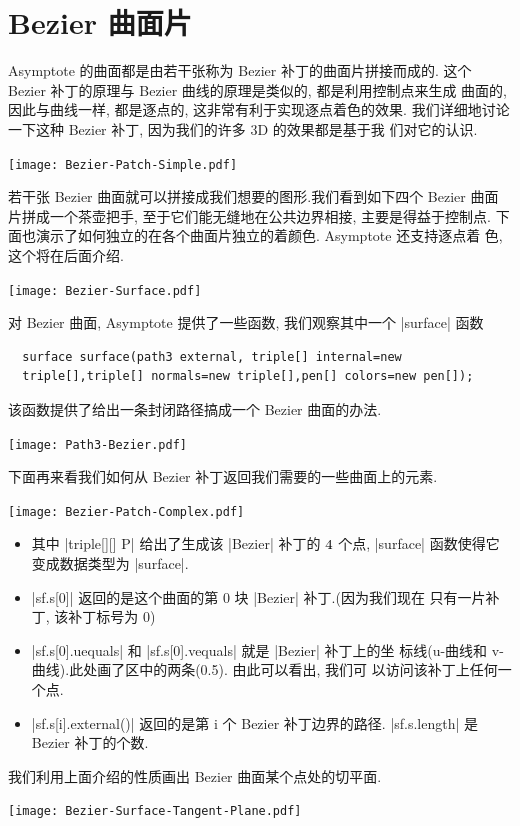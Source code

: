 \documentclass[nofonts,CJKnormalspaces]{ctexbook}[2009/05/20]
\begin{document}
\section{Bezier 曲面片}
Asymptote 的曲面都是由若干张称为 Bezier 补丁的曲面片拼接而成的. 这个
Bezier 补丁的原理与 Bezier 曲线的原理是类似的, 都是利用控制点来生成
曲面的, 因此与曲线一样, 都是逐点的, 这非常有利于实现逐点着色的效果.
我们详细地讨论一下这种 Bezier 补丁, 因为我们的许多 3D 的效果都是基于我
们对它的认识.
\begin{center}\texttt{[image: Bezier-Patch-Simple.pdf]}\end{center}%

若干张 Bezier 曲面就可以拼接成我们想要的图形.我们看到如下四个 Bezier 曲面
片拼成一个茶壶把手, 至于它们能无缝地在公共边界相接, 主要是得益于控制点.
下面也演示了如何独立的在各个曲面片独立的着颜色. Asymptote 还支持逐点着
色, 这个将在后面介绍.
\begin{center}\texttt{[image: Bezier-Surface.pdf]}\end{center}%

对 Bezier 曲面, Asymptote 提供了一些函数, 我们观察其中一个 |surface| 函数
\begin{lstlisting}
  surface surface(path3 external, triple[] internal=new
  triple[],triple[] normals=new triple[],pen[] colors=new pen[]);
\end{lstlisting}
该函数提供了给出一条封闭路径搞成一个 Bezier 曲面的办法.
\begin{center}\texttt{[image: Path3-Bezier.pdf]}\end{center}%

下面再来看我们如何从 Bezier 补丁返回我们需要的一些曲面上的元素.
\begin{center}\texttt{[image: Bezier-Patch-Complex.pdf]}\end{center}%

\begin{itemize}
\item 其中 |triple[][] P| 给出了生成该 |Bezier| 补丁的 $4 \time 4$ 个点,
  |surface| 函数使得它变成数据类型为 |surface|.
\item |sf.s[0]| 返回的是这个曲面的第 0 块 |Bezier| 补丁.(因为我们现在
  只有一片补丁, 该补丁标号为 0)
\item |sf.s[0].uequals| 和 |sf.s[0].vequals| 就是 |Bezier| 补丁上的坐
  标线(u-曲线和 v-曲线).此处画了区中的两条(0.5). 由此可以看出, 我们可
  以访问该补丁上任何一个点.
\item |sf.s[i].external()| 返回的是第 i 个 Bezier 补丁边界的路径.
  |sf.s.length| 是 Bezier 补丁的个数.
\end{itemize}
我们利用上面介绍的性质画出 Bezier 曲面某个点处的切平面.
\begin{center}\texttt{[image: Bezier-Surface-Tangent-Plane.pdf]}\end{center}%

\end{document}
